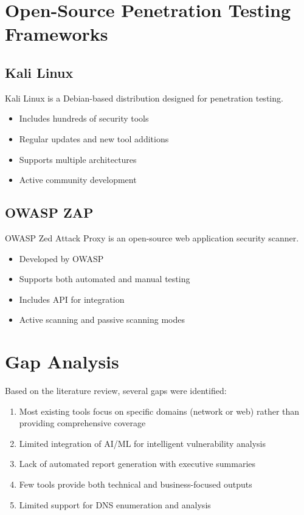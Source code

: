 \documentclass[12pt,a4paper]{report}
\begin{document}
\section{Open-Source Penetration Testing Frameworks}

\subsection{Kali Linux}

Kali Linux is a Debian-based distribution designed for penetration testing.

\begin{itemize}
    \item Includes hundreds of security tools
    \item Regular updates and new tool additions
    \item Supports multiple architectures
    \item Active community development
\end{itemize}

\subsection{OWASP ZAP}

OWASP Zed Attack Proxy is an open-source web application security scanner.

\begin{itemize}
    \item Developed by OWASP
    \item Supports both automated and manual testing
    \item Includes API for integration
    \item Active scanning and passive scanning modes
\end{itemize}

\section{Gap Analysis}

Based on the literature review, several gaps were identified:

\begin{enumerate}
    \item Most existing tools focus on specific domains (network or web) rather than providing comprehensive coverage
    \item Limited integration of AI/ML for intelligent vulnerability analysis
    \item Lack of automated report generation with executive summaries
    \item Few tools provide both technical and business-focused outputs
    \item Limited support for DNS enumeration and analysis
\end{enumerate}
\end{document}
